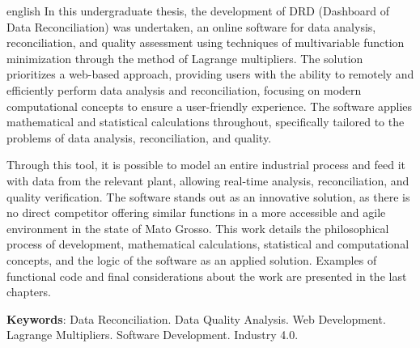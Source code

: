 \begin{resumo}[Abstract]
    \SingleSpacing
    \begin{otherlanguage*}{english}
    In this undergraduate thesis, the development of DRD (Dashboard of Data Reconciliation) was undertaken, an online software for data analysis, reconciliation, and quality assessment using techniques of multivariable function minimization through the method of Lagrange multipliers. The solution prioritizes a web-based approach, providing users with the ability to remotely and efficiently perform data analysis and reconciliation, focusing on modern computational concepts to ensure a user-friendly experience. The software applies mathematical and statistical calculations throughout, specifically tailored to the problems of data analysis, reconciliation, and quality.

    Through this tool, it is possible to model an entire industrial process and feed it with data from the relevant plant, allowing real-time analysis, reconciliation, and quality verification. The software stands out as an innovative solution, as there is no direct competitor offering similar functions in a more accessible and agile environment in the state of Mato Grosso. This work details the philosophical process of development, mathematical calculations, statistical and computational concepts, and the logic of the software as an applied solution. Examples of functional code and final considerations about the work are presented in the last chapters.
    
    \textbf{Keywords}:  Data Reconciliation. Data Quality Analysis. Web Development. Lagrange Multipliers. Software Development. Industry 4.0.
    \end{otherlanguage*}
\end{resumo}

{
    \hypersetup{hidelinks}
    
    \listoffigures*
    \cleardoublepage
    
    \listofquadros*
    \cleardoublepage
    
    \listoftables*
    \cleardoublepage
        
    \imprimirlistadesiglas
    \imprimirlistadesimbolos
    
    \tableofcontents*
    \cleardoublepage
}